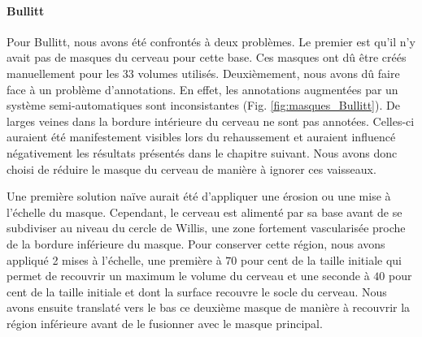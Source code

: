 \paragraph{Bullitt}
Pour Bullitt, nous avons été confrontés à deux problèmes. Le premier est qu'il n'y avait pas de masques du cerveau pour cette base. Ces masques ont dû être créés manuellement pour les 33 volumes utilisés. Deuxièmement, nous avons dû faire face à un problème d'annotations. En effet, les annotations augmentées par un système semi-automatiques sont inconsistantes (Fig. \ref{fig:masques_Bullitt}). De larges veines dans la bordure intérieure du cerveau ne sont pas annotées. Celles-ci auraient été manifestement visibles lors du rehaussement et auraient influencé négativement les résultats présentés dans le chapitre suivant. Nous avons donc choisi de réduire le masque du cerveau de manière à ignorer ces vaisseaux.

Une première solution naïve aurait été d'appliquer une érosion ou une mise à l'échelle du masque. Cependant, le cerveau est alimenté par sa base avant de se subdiviser au niveau du cercle de Willis, une zone fortement vascularisée proche de la bordure inférieure du masque. Pour conserver cette région, nous avons appliqué 2 mises à l'échelle, une première à $70$ pour cent de la taille initiale qui permet de recouvrir un maximum le volume du cerveau et une seconde à $40$ pour cent de la taille initiale et dont la surface recouvre le socle du cerveau. Nous avons ensuite translaté vers le bas ce deuxième masque de manière à recouvrir la région inférieure avant de le fusionner avec le masque principal.


